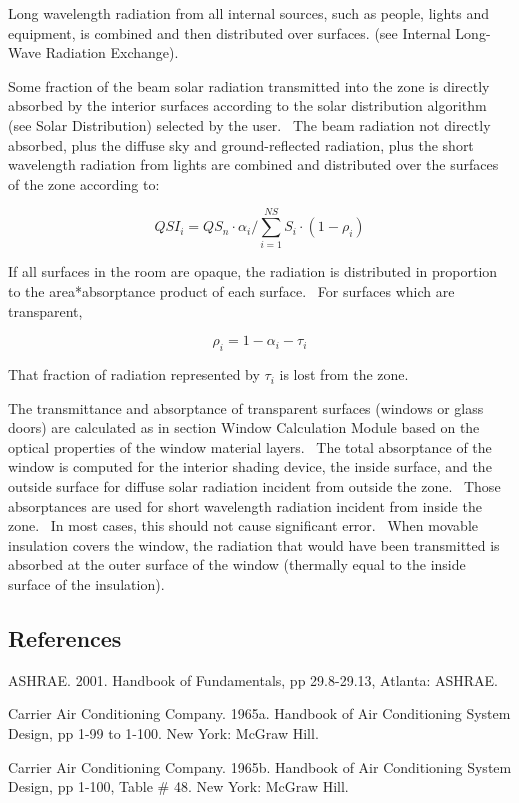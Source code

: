Long wavelength radiation from all internal sources, such as people, lights and equipment, is combined and then distributed over surfaces. (see Internal Long-Wave Radiation Exchange).

Some fraction of the beam solar radiation transmitted into the zone is directly absorbed by the interior surfaces according to the solar distribution algorithm (see Solar Distribution) selected by the user.~ The beam radiation not directly absorbed, plus the diffuse sky and ground-reflected radiation, plus the short wavelength radiation from lights are combined and distributed over the surfaces of the zone according to:

\begin{equation}
QS{I_i} = Q{S_n}\cdot {\alpha_i}/\sum\limits_{i = 1}^{NS} {{S_i}\cdot (1 - {\rho_i})}
\end{equation}

If all surfaces in the room are opaque, the radiation is distributed in proportion to the area*absorptance product of each surface.~ For surfaces which are transparent,

\begin{equation}
{\rho_i} = 1 - {\alpha_i} - {\tau_i}
\end{equation}

That fraction of radiation represented by \({\tau_i}\) is lost from the zone.

The transmittance and absorptance of transparent surfaces (windows or glass doors) are calculated as in section Window Calculation Module based on the optical properties of the window material layers.~ The total absorptance of the window is computed for the interior shading device, the inside surface, and the outside surface for diffuse solar radiation incident from outside the zone.~ Those absorptances are used for short wavelength radiation incident from inside the zone.~ In most cases, this should not cause significant error.~ When movable insulation covers the window, the radiation that would have been transmitted is absorbed at the outer surface of the window (thermally equal to the inside surface of the insulation).

\subsection{References}\label{references-057}

ASHRAE. 2001. Handbook of Fundamentals, pp 29.8-29.13, Atlanta: ASHRAE.

Carrier Air Conditioning Company. 1965a. Handbook of Air Conditioning System Design, pp 1-99 to 1-100. New York: McGraw Hill.

Carrier Air Conditioning Company. 1965b. Handbook of Air Conditioning System Design, pp 1-100, Table \# 48. New York: McGraw Hill.
